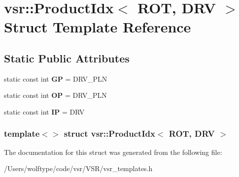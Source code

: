 \hypertarget{structvsr_1_1_product_idx_3_01_r_o_t_00_01_d_r_v_01_4}{\section{vsr\-:\-:Product\-Idx$<$ R\-O\-T, D\-R\-V $>$ Struct Template Reference}
\label{structvsr_1_1_product_idx_3_01_r_o_t_00_01_d_r_v_01_4}
}
\subsection*{Static Public Attributes}
\begin{DoxyCompactItemize}
\item 
\hypertarget{structvsr_1_1_product_idx_3_01_r_o_t_00_01_d_r_v_01_4_aed6b43d3c1f9ab262392f1a5a6e4f9fa}{static const int {\bfseries G\-P} = D\-R\-V\-\_\-\-P\-L\-N}\label{structvsr_1_1_product_idx_3_01_r_o_t_00_01_d_r_v_01_4_aed6b43d3c1f9ab262392f1a5a6e4f9fa}

\item 
\hypertarget{structvsr_1_1_product_idx_3_01_r_o_t_00_01_d_r_v_01_4_ae3fe81a36472cba8f60dee6306e99842}{static const int {\bfseries O\-P} = D\-R\-V\-\_\-\-P\-L\-N}\label{structvsr_1_1_product_idx_3_01_r_o_t_00_01_d_r_v_01_4_ae3fe81a36472cba8f60dee6306e99842}

\item 
\hypertarget{structvsr_1_1_product_idx_3_01_r_o_t_00_01_d_r_v_01_4_af97f5d6a5b2dc742dbc5a8c360c49b51}{static const int {\bfseries I\-P} = D\-R\-V}\label{structvsr_1_1_product_idx_3_01_r_o_t_00_01_d_r_v_01_4_af97f5d6a5b2dc742dbc5a8c360c49b51}

\end{DoxyCompactItemize}
\subsubsection*{template$<$$>$ struct vsr\-::\-Product\-Idx$<$ R\-O\-T, D\-R\-V $>$}



The documentation for this struct was generated from the following file\-:\begin{DoxyCompactItemize}
\item 
/\-Users/wolftype/code/vsr/\-V\-S\-R/vsr\-\_\-templates.\-h\end{DoxyCompactItemize}
